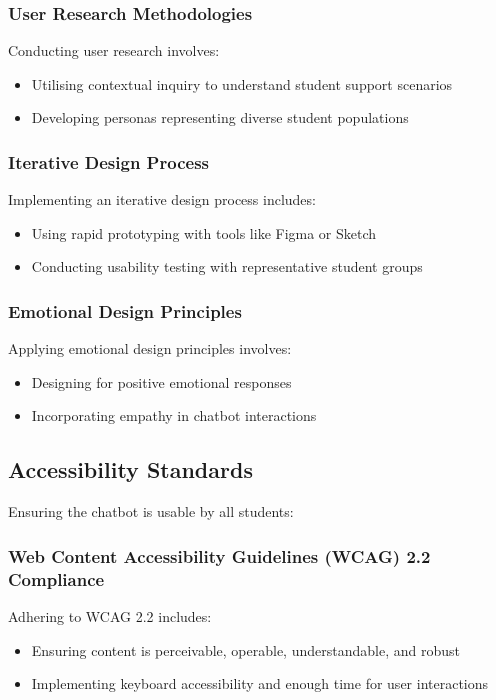 \documentclass[15pt,a4paper]{article}
\begin{document}
\begin{multicols}{2}
\subsubsection*{User Research Methodologies}
Conducting user research \textit{\parencite[pp. 50-100]{Goodman2023}} involves:
\begin{itemize}
    \item Utilising contextual inquiry to understand student support scenarios
    \item Developing personas representing diverse student populations
\end{itemize}

\subsubsection*{Iterative Design Process}
Implementing an iterative design process \textit{\parencite[pp. 30-60]{HoltzblattBeyer2024}} includes:
\begin{itemize}
    \item Using rapid prototyping with tools like Figma or Sketch
    \item Conducting usability testing with representative student groups
\end{itemize}

\subsubsection*{Emotional Design Principles}
Applying emotional design principles \textit{\parencite[pp. 10-40]{Norman2023}} involves:
\begin{itemize}
    \item Designing for positive emotional responses
    \item Incorporating empathy in chatbot interactions
\end{itemize}

\subsection{Accessibility Standards}
Ensuring the chatbot is usable by all students:

\subsubsection*{Web Content Accessibility Guidelines (WCAG) 2.2 Compliance}
Adhering to WCAG 2.2 \textit{\parencite{W3C2023}} includes:
\begin{itemize}
    \item Ensuring content is perceivable, operable, understandable, and robust
    \item Implementing keyboard accessibility and enough time for user interactions
\end{itemize}


\end{multicols}
\end{document}
